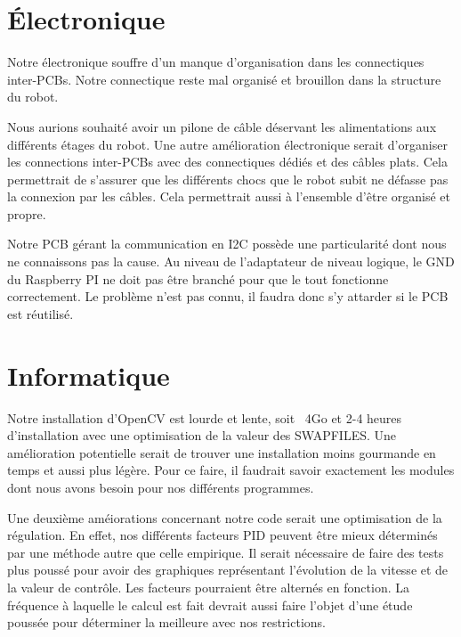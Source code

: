\documentclass[
	a4paper,									%
	11pt,										%
	twoside,									%
	openright,									%
	notitlepage,									%
	parskip=half,								%
]{scrreprt}										%
\begin{document}
\section{Électronique}

Notre électronique souffre d'un manque d'organisation dans les connectiques inter-PCBs.
Notre connectique reste mal organisé et brouillon dans la structure du robot. \par

Nous aurions souhaité avoir un pilone de câble déservant les alimentations aux 
différents étages du robot. Une autre amélioration électronique serait d'organiser les 
connections inter-PCBs avec des connectiques dédiés et des câbles plats. Cela permettrait 
de s'assurer que les différents chocs que le robot subit ne défasse pas la connexion 
par les câbles. Cela permettrait aussi à l'ensemble d'être organisé et propre. \par

Notre PCB gérant la communication en I2C possède une particularité dont nous ne connaissons pas 
la cause. Au niveau de l'adaptateur de niveau logique, le GND du Raspberry PI ne doit pas être branché 
pour que le tout fonctionne correctement. Le problème n'est pas connu, il faudra donc s'y attarder
si le PCB est réutilisé. \par


\section{Informatique}

Notre installation d'OpenCV est lourde et lente, soit ~4Go et 2-4 heures d'installation
avec une optimisation de la valeur des SWAPFILES. Une amélioration potentielle serait de trouver
une installation moins gourmande en temps et aussi plus légère. Pour ce faire, il faudrait savoir
exactement les modules dont nous avons besoin pour nos différents programmes. \par

Une deuxième améiorations concernant notre code serait une optimisation de la régulation. 
En effet, nos différents facteurs PID peuvent être mieux déterminés par une méthode autre 
que celle empirique. Il serait nécessaire de faire des tests plus poussé pour avoir 
des graphiques représentant l'évolution de la vitesse et de la valeur de contrôle. Les facteurs
pourraient être alternés en fonction. La fréquence à laquelle le calcul est fait devrait aussi 
faire l'objet d'une étude poussée pour déterminer la meilleure avec nos restrictions. \par
\end{document}
